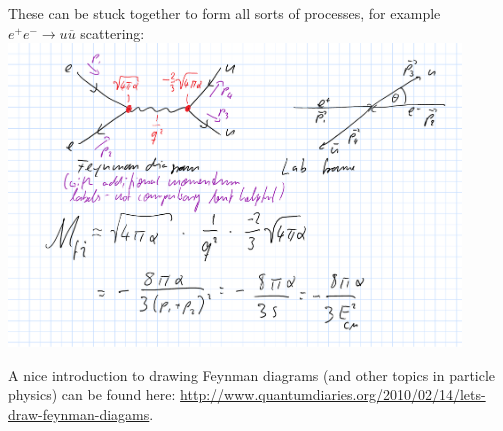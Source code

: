 These can be stuck together to form all sorts of processes, for example $e^+ e^- \to u \overline{u}$ scattering:
\\
\includegraphics[width=0.9\textwidth]{fig/ExampleQED_1}


A nice introduction to drawing Feynman diagrams (and other topics in particle physics) can be found here: \href{http://www.quantumdiaries.org/2010/02/14/lets-draw-feynman-diagams}{http://www.quantumdiaries.org/2010/02/14/lets-draw-feynman-diagams}.
